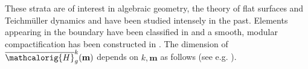 \documentclass[11pt]{article}
\newcommand{\M}{\ensuremath{\overline{\mathcalorig{M}}}}
\begin{document}
These strata are of interest in algebraic geometry, the theory of flat surfaces and Teichm\"uller dynamics and have been studied intensely in the past. Elements appearing in the boundary have been classified in \cite{BCGGM1, BCGGM2} and a smooth, modular compactification has been constructed in \cite{BCGGM3}. The dimension of $\overline{\mathcalorig{H}}_g^k(\textbf{m})$ depends on $k, \textbf{m}$ as follows (see e.g. \cite{FP, SchmittDimension}).
\end{document}
